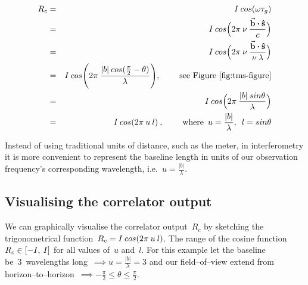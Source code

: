 \documentclass[11pt, a4paper]{article}
\newcommand{\msp}{\mkern \medmuskip}
\begin{document}
\begin{eqnarray}
  \label{eq:7}
  R_c &=& I \msp cos(\omega \tau _g) \nonumber \\
      &=& I \msp cos\Big (2\pi \msp \nu \msp \frac{\vec{\mathbf{b}} \boldsymbol{\cdot } \mathbf{\hat{s}}}{c}\Big ) \nonumber \\
      &=& I \msp cos\Big (2\pi \msp \nu \msp \frac{\vec{\mathbf{b}} \boldsymbol{\cdot } \mathbf{\hat{s}}}{\nu \msp \lambda}\Big ) \nonumber \\
      &=& I \msp cos\Bigg (2\pi \msp \frac{|b|\msp cos(\frac{\pi }{2} - \theta)}{\lambda}\Bigg ) , \hspace{0.8cm} \mbox{see Figure~\ref{fig:tms-figure}} \nonumber \\
      &=& I \msp cos\Big (2\pi \msp \frac{|b| \msp sin \theta}{\lambda} \Big) \nonumber \\
      &=& I \msp cos(2\pi \msp u \msp l) \msp , \hspace{0.8cm} \mbox{where} \enspace u = \frac{|b|}{\lambda}, \enspace l = sin \theta
\end{eqnarray}

Instead of using traditional units of distance, such as the meter, in interferometry it is more convenient to represent the baseline length in units of our observation frequency's corresponding wavelength, i.e.~$u = \frac{|b|}{\lambda}$.

\subsection{Visualising the correlator output}

We can graphically visualise the correlator output~$R_c$ by sketching the trigonometrical function~$R_c = I \msp cos(2\pi \msp u \msp l)$. The range of the cosine function~$R_c \in [-I, \msp I]$ for all values of~$u$ and~$l$. For this example let the baseline be~3~wavelengths long~$\implies u = \frac{|b|}{\lambda} = 3$ and our field--of--view extend from horizon--to--horizon~$\implies -\frac{\pi}{2} \leq \theta \leq \frac{\pi}{2}$.
\end{document}
